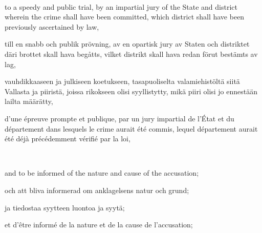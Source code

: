 \documentclass[a4paper,landscape,12pt]{article}
\begin{document}
~

\begin{minipage}[t]{0.22\textwidth}
 to a speedy and public trial, by an impartial jury of the State and district wherein the crime shall have been committed, which district shall have been previously ascertained by law,
\end{minipage}\textwidth
\begin{minipage}[t]{0.22\textwidth}
till en snabb och publik prövning, av en opartisk jury av Staten och distriktet däri brottet skall hava begåtts, vilket distrikt skall hava redan förut bestämts av lag,
\end{minipage}\textwidth
\begin{minipage}[t]{0.22\textwidth}
vauhdikkaaseen ja julkiseen koetukseen, tasapuoliselta valamiehistöltä siitä Vallasta ja piiristä, joissa rikokseen olisi syyllistytty, mikä piiri olisi jo ennestään lailta määrätty,
\end{minipage}\textwidth
\begin{minipage}[t]{0.22\textwidth}
d'une épreuve prompte et publique, par un jury impartial de l'État et du département dans lesquels le crime aurait été commis, lequel département aurait été déjà précédemment vérifié par la loi,
\end{minipage}

~

\begin{minipage}[t]{0.22\textwidth}
and to be informed of the nature and cause of the accusation;
\end{minipage}\textwidth
\begin{minipage}[t]{0.22\textwidth}
och att bliva informerad om anklagelsens natur och grund;
\end{minipage}\textwidth
\begin{minipage}[t]{0.22\textwidth}
ja tiedostaa syytteen luontoa ja syytä;
\end{minipage}\textwidth
\begin{minipage}[t]{0.22\textwidth}
et d'être informé de la nature et de la cause de l'accusation;
\end{minipage}

~
\end{document}
